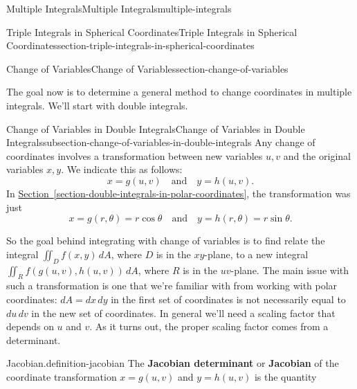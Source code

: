 \documentclass[oneside,10pt,]{book}
\newcommand{\terminology}[1]{\textbf{#1}}
\numberwithin{equation}{section}
\newcommand{\qq}[1]{\quad\text{#1}\quad}
\begin{document}
\begin{chapterptx}{Multiple Integrals}{}{Multiple Integrals}{}{}{multiple-integrals}
\begin{sectionptx}{Triple Integrals in Spherical Coordinates}{}{Triple Integrals in Spherical Coordinates}{}{}{section-triple-integrals-in-spherical-coordinates}
\end{sectionptx}
%
%
\typeout{************************************************}
\typeout{************************************************}
%
\begin{sectionptx}{Change of Variables}{}{Change of Variables}{}{}{section-change-of-variables}
\begin{introduction}{}%
\hypertarget{p-1543}{}%
The goal now is to determine a general method to change coordinates in multiple integrals. We'll start with double integrals.%
\end{introduction}%
%
%
\typeout{************************************************}
\typeout{************************************************}
%
\begin{subsectionptx}{Change of Variables in Double Integrals}{}{Change of Variables in Double Integrals}{}{}{subsection-change-of-variables-in-double-integrals}
\hypertarget{p-1544}{}%
Any change of coordinates involves a transformation between new variables \(u,v\) and the original variables \(x,y\). We indicate this as follows:%
\begin{equation*}
x = g(u,v) \qq{and} y = h(u,v)\text{.}
\end{equation*}
In \hyperref[section-double-integrals-in-polar-coordinates]{Section~\ref{section-double-integrals-in-polar-coordinates}}, the transformation was just%
\begin{equation*}
x = g(r,\theta) = r\cos\theta \qq{and} y = h(r,\theta) = r\sin\theta\text{.}
\end{equation*}
%
\par
\hypertarget{p-1545}{}%
So the goal behind integrating with change of variables is to find relate the integral \(\iint_{D}f(x,y)\,dA\), where \(D\) is in the \(xy\)-plane, to a new integral \(\iint_{R}f(g(u,v),h(u,v))\,dA\), where \(R\) is in the \(uv\)-plane. The main issue with such a transformation is one that we're familiar with from working with polar coordinates: \(dA = dx\,dy\) in the first set of coordinates is not necessarily equal to \(du\,dv\) in the new set of coordinates. In general we'll need a scaling factor that depends on \(u\) and \(v\). As it turns out, the proper scaling factor comes from a determinant.%
\begin{definition}{Jacobian.}{definition-jacobian}%
\hypertarget{p-1546}{}%
The \terminology{Jacobian determinant} or \terminology{Jacobian} of the coordinate transformation \(x = g(u,v)\) and \(y = h(u,v)\) is the quantity%

\end{definition}
\end{subsectionptx}
\end{sectionptx}
\end{chapterptx}
\end{document}

